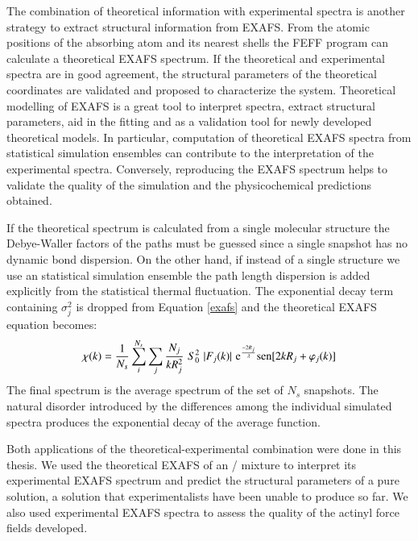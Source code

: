 The combination of theoretical information with experimental spectra is another strategy to extract 
structural information 
from EXAFS. From the atomic positions of the absorbing atom and its nearest shells the FEFF program 
can calculate a theoretical EXAFS spectrum. If the theoretical and experimental spectra are in good 
agreement, the structural parameters of the theoretical coordinates are validated and proposed to 
characterize the system. Theoretical modelling of EXAFS is a great tool to interpret spectra, 
extract structural parameters, aid in the fitting and as a validation 
tool for newly developed theoretical models. In particular, computation of theoretical EXAFS 
spectra from statistical simulation ensembles can contribute to the interpretation of 
the experimental spectra\cite{Angew_ESM_2010,Dangelo_InorgChem_2013,spezia2017development,
ChemPhysLet_Filipponi_1994,JPhysChem_Palmer_1996,JACS_ESM_2002}. Conversely, reproducing the EXAFS 
spectrum helps to validate the quality of the simulation and the physicochemical predictions 
obtained. 

If the theoretical spectrum is calculated from a single molecular structure the Debye-Waller 
factors of the paths must be guessed since a single snapshot has no dynamic bond dispersion. 
On 
the other 
hand, if instead of a single structure we use an statistical simulation ensemble the path 
length 
dispersion is added explicitly from the statistical thermal fluctuation. The 
exponential decay term containing $\sigma_j^2$ is dropped from Equation \ref{exafs} and the 
theoretical EXAFS equation 
becomes:\cite{Merkling2001}
\begin{equation}\label{exafs-MD}
\chi(k)=\frac{1}{N_{s}}\sum_i^{N_{s}}\sum_j\frac{N_j}{kR_j^2}\,\,
S_0^2\,\,|F_j(k)|\,\,\mathrm{e}^{\frac{-2R_j}{\lambda}}\text{sen}[2kR_j+\varphi_j(k)]
\end{equation}
The final spectrum is the average spectrum of the set of $N_s$ snapshots. The natural disorder 
introduced by the differences among  
the individual simulated spectra produces the exponential decay of the average function.

Both applications of the theoretical-experimental combination were done in this thesis. We used the 
theoretical EXAFS of an / mixture to interpret its experimental 
EXAFS spectrum and predict the structural parameters of a pure  solution, a 
solution that experimentalists have been unable to produce so far.  We also used experimental EXAFS 
spectra to assess 
the quality of the actinyl force fields developed. 

